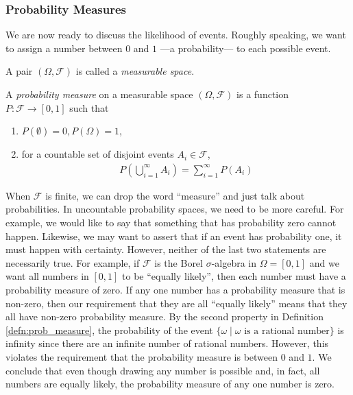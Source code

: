 \documentclass[\topdir/lecture\_notes.tex]{subfiles}
\begin{document}
\subsubsection*{Probability Measures}
We are now ready to discuss the likelihood of events. Roughly speaking, we want to assign a number between $0$ and $1$ ---a probability--- to each possible event. 
\begin{defn}
A pair $(\Omega, \mathcal{F})$ is called a \emph{measurable space}.
\end{defn}
\begin{defn}\label{defn:prob_measure}
A \emph{probability measure} on a measurable space $(\Omega, \mathcal{F})$ is a function $P: \mathcal{F} \rightarrow[0,1]$ such that
\begin{enumerate}
  \item $P(\emptyset)=0, P(\Omega)=1$,
  \item for a countable set of disjoint events $A_{i} \in \mathcal{F}$,
    \begin{align*}
        P\left(\bigcup_{i=1}^{\infty} A_{i}\right)=\sum_{i=1}^{\infty} P(A_{i})
    \end{align*}
\end{enumerate}
\end{defn}

When $\mathcal{F}$ is finite, we can drop the word ``measure'' and just talk about probabilities. In uncountable probability spaces, we need to be more careful. For example, we would like to say that something that has probability zero cannot happen. Likewise, we may want to assert that if an event has probability one, it must happen with certainty. However, neither of the last two statements are necessarily true. For example, if $\mathcal{F}$ is the Borel $\sigma$-algebra in $\Omega = [0,1]$ and we want all numbers in $[0,1]$ to be ``equally likely'', then each number must have a probability measure of zero. If any one number has a probability measure that is non-zero, then our requirement that they are all ``equally likely'' means that they all have non-zero probability measure. By the second property in Definition \ref{defn:prob_measure}, the probability of the event $\{\omega \mid \omega \text{ is a rational number}\}$ is infinity since there are an infinite number of rational numbers. However, this violates the requirement that the probability measure is between $0$ and $1$. We conclude that even though drawing any number is possible and, in fact, all numbers are equally likely, the probability measure of any one number is zero.
\end{document}
